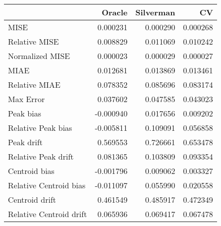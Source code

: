 \begin{tabular}{lrrr}
  \hline
 & Oracle & Silverman & CV \\ 
  \hline
MISE & 0.000231 & 0.000290 & 0.000268 \\ 
  Relative MISE & 0.008829 & 0.011069 & 0.010242 \\ 
  Normalized MISE & 0.000023 & 0.000029 & 0.000027 \\ 
  MIAE & 0.012681 & 0.013869 & 0.013461 \\ 
  Relative MIAE & 0.078352 & 0.085696 & 0.083174 \\ 
  Max Error & 0.037602 & 0.047585 & 0.043023 \\ 
  Peak bias & -0.000940 & 0.017656 & 0.009202 \\ 
  Relative Peak bias & -0.005811 & 0.109091 & 0.056858 \\ 
  Peak drift & 0.569553 & 0.726661 & 0.653478 \\ 
  Relative Peak drift & 0.081365 & 0.103809 & 0.093354 \\ 
  Centroid bias & -0.001796 & 0.009062 & 0.003327 \\ 
  Relative Centroid bias & -0.011097 & 0.055990 & 0.020558 \\ 
  Centroid drift & 0.461549 & 0.485917 & 0.472349 \\ 
  Relative Centroid drift & 0.065936 & 0.069417 & 0.067478 \\ 
   \hline
\end{tabular}
